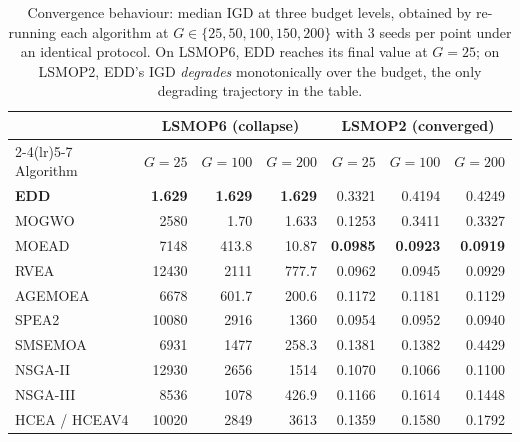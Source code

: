 \begin{table}[t]
\centering
\caption{Convergence behaviour: median IGD at three budget levels, obtained
by re-running each algorithm at $G\in\{25,50,100,150,200\}$ with 3 seeds per
point under an identical protocol. On LSMOP6, EDD reaches its final value at
$G=25$; on LSMOP2, EDD's IGD \emph{degrades} monotonically over the budget,
the only degrading trajectory in the table.}
\label{tab:conv}
\setlength{\tabcolsep}{5pt}
\begin{tabular}{lrrrrrr}
\toprule
& \multicolumn{3}{c}{LSMOP6 (collapse)} & \multicolumn{3}{c}{LSMOP2 (converged)} \\
\cmidrule(lr){2-4}\cmidrule(lr){5-7}
Algorithm & $G{=}25$ & $G{=}100$ & $G{=}200$ & $G{=}25$ & $G{=}100$ & $G{=}200$ \\
\midrule
\textbf{EDD}   & \textbf{1.629} & \textbf{1.629} & \textbf{1.629} & 0.3321 & 0.4194 & 0.4249 \\
MOGWO          & 2580   & 1.70   & 1.633  & 0.1253 & 0.3411 & 0.3327 \\
MOEAD          & 7148   & 413.8  & 10.87  & \textbf{0.0985} & \textbf{0.0923} & \textbf{0.0919} \\
RVEA           & 12430  & 2111   & 777.7  & 0.0962 & 0.0945 & 0.0929 \\
AGEMOEA        & 6678   & 601.7  & 200.6  & 0.1172 & 0.1181 & 0.1129 \\
SPEA2          & 10080  & 2916   & 1360   & 0.0954 & 0.0952 & 0.0940 \\
SMSEMOA        & 6931   & 1477   & 258.3  & 0.1381 & 0.1382 & 0.4429 \\
NSGA-II        & 12930  & 2656   & 1514   & 0.1070 & 0.1066 & 0.1100 \\
NSGA-III       & 8536   & 1078   & 426.9  & 0.1166 & 0.1614 & 0.1448 \\
HCEA / HCEAV4  & 10020  & 2849   & 3613   & 0.1359 & 0.1580 & 0.1792 \\
\bottomrule
\end{tabular}
\end{table}

